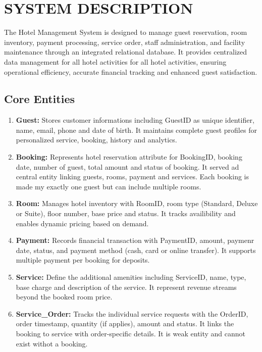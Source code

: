 \documentclass[a4paper, 12pt]{article}
\begin{document}
    \section{SYSTEM DESCRIPTION}
    The Hotel Management System is designed to manage guest reservation, room inventory, payment processing, service order, staff administration, and facility maintenance through an integrated relational database. It provides centralized data management for all hotel activities for all hotel activities, ensuring operational efficiency, accurate financial tracking and enhanced guest satisfaction.

    \subsection{Core Entities}
    \begin{enumerate}
        \item \textbf{Guest:} 
                Stores customer informations including GuestID as unique identifier, name, email, phone and date of birth. It maintains complete guest profiles for personalized service, booking, history and analytics.
        \item \textbf{Booking:}
                Represents hotel reservation attribute for BookingID, booking date, number of guest, total amount and status of booking. It served ad central entity linking guests, rooms, payment and services. Each booking is made my exactly one guest but can include multiple rooms.
        \item \textbf{Room:}
                Manages hotel inventory with RoomID, room type (Standard, Deluxe or Suite), floor number, base price and status. It tracks availibility and enables dynamic pricing based on demand.
        \item \textbf{Payment:}
                Records financial transaction with PaymentID, amount, paymenr date, status, and payment method (cash, card or online transfer). It supports multiple payment per booking for deposits.
        \item \textbf{Service:}
                Define the additional amenities including ServiceID, name, type, base charge and description of the service. It represent revenue streams beyond the booked room price.
        \item \textbf{Service\_Order:}
                Tracks the individual service requests with the OrderID, order timestamp, quantity (if applies), amount and status. It links the booking to service with order-specific details. It is weak entity and cannot exist withot a booking.

\end{enumerate}
\end{document}
